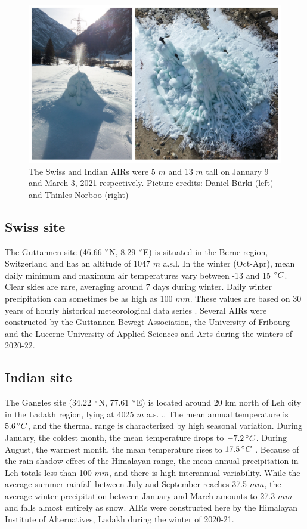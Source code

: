 \begin{figure}[htb]
	\centering
	\includegraphics[width=12 cm]{figs/2AIRs.jpg}
	\caption{The Swiss and Indian \ac{AIRs} were 5 $m$ and 13 $m$ tall on January 9 and March 3, 2021 respectively. Picture
		credits: Daniel Bürki (left) and Thinles Norboo (right)}
	\label{fig:2AIRs}
\end{figure}

\subsection{Swiss site}

The Guttannen site (46.66 $^{\circ}$N, 8.29 $^{\circ}$E) is situated in the Berne region, Switzerland and has an
altitude of 1047 $m$ a.s.l. In the winter (Oct-Apr), mean daily minimum and maximum air temperatures vary
between -13 and 15 $^{\circ} C$. Clear skies are rare, averaging around 7 days during winter. Daily winter
precipitation can sometimes be as high as 100 $mm$. These values are based on 30 years of hourly historical
meteorological data series \citep{meteoblueClimateGuttannen2021}. Several \ac{AIRs} were constructed by the Guttannen
Bewegt Association, the University of Fribourg and the Lucerne University of Applied Sciences and Arts during
the winters of 2020-22.

\subsection{Indian site}

The Gangles site (34.22 $^{\circ}$N, 77.61 $^{\circ}$E) is located around 20 km north of Leh city in the Ladakh
region, lying at 4025 $m$ a.s.l.. The mean annual temperature is $5.6 \, ^{\circ} C$, and the thermal range is
characterized by high seasonal variation. During January, the coldest month, the mean temperature drops to $-7.2
	\, ^{\circ} C$. During August, the warmest month, the mean temperature rises to $17.5 \, ^{\circ} C$
\citep{nusserIrrigationDevelopmentUpper2012}. Because of the rain shadow effect of the Himalayan range, the mean
annual precipitation in Leh totals less than 100 $mm$, and there is high interannual variability. While the
average summer rainfall between July and September reaches 37.5 $mm$, the average winter precipitation between
January and March amounts to 27.3 $ mm$ and falls almost entirely as snow. \ac{AIRs} were constructed here by the
Himalayan Institute of Alternatives, Ladakh during the winter of 2020-21.

